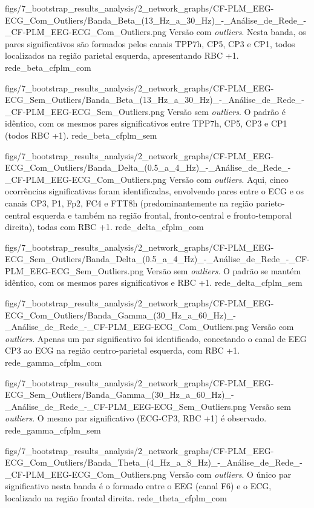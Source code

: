 \smallfigure
{figs/7_bootstrap_results_analysis/2_network_graphs/CF-PLM_EEG-ECG_Com_Outliers/Banda_Beta_(13_Hz_a_30_Hz)_-_Análise_de_Rede_-_CF-PLM_EEG-ECG_Com_Outliers.png}
{Versão com \textit{outliers}. Nesta banda, os pares significativos são formados pelos canais TPP7h, CP5, CP3 e CP1, todos localizados na região parietal esquerda, apresentando RBC +1.}
{rede_beta_cfplm_com}

\smallfigure
{figs/7_bootstrap_results_analysis/2_network_graphs/CF-PLM_EEG-ECG_Sem_Outliers/Banda_Beta_(13_Hz_a_30_Hz)_-_Análise_de_Rede_-_CF-PLM_EEG-ECG_Sem_Outliers.png}
{Versão sem \textit{outliers}. O padrão é idêntico, com os mesmos pares significativos entre TPP7h, CP5, CP3 e CP1 (todos RBC +1).}
{rede_beta_cfplm_sem}

\smallfigure
{figs/7_bootstrap_results_analysis/2_network_graphs/CF-PLM_EEG-ECG_Com_Outliers/Banda_Delta_(0.5_a_4_Hz)_-_Análise_de_Rede_-_CF-PLM_EEG-ECG_Com_Outliers.png}
{Versão com \textit{outliers}. Aqui, cinco ocorrências significativas foram identificadas, envolvendo pares entre o ECG e os canais CP3, P1, Fp2, FC4 e FTT8h (predominantemente na região parieto-central esquerda e também na região frontal, fronto-central e fronto-temporal direita), todas com RBC +1.}
{rede_delta_cfplm_com}

\smallfigure
{figs/7_bootstrap_results_analysis/2_network_graphs/CF-PLM_EEG-ECG_Sem_Outliers/Banda_Delta_(0.5_a_4_Hz)_-_Análise_de_Rede_-_CF-PLM_EEG-ECG_Sem_Outliers.png}
{Versão sem \textit{outliers}. O padrão se mantém idêntico, com os mesmos pares significativos e RBC +1.}
{rede_delta_cfplm_sem}

\smallfigure
{figs/7_bootstrap_results_analysis/2_network_graphs/CF-PLM_EEG-ECG_Com_Outliers/Banda_Gamma_(30_Hz_a_60_Hz)_-_Análise_de_Rede_-_CF-PLM_EEG-ECG_Com_Outliers.png}
{Versão com \textit{outliers}. Apenas um par significativo foi identificado, conectando o canal de EEG CP3 ao ECG na região centro-parietal esquerda, com RBC +1.}
{rede_gamma_cfplm_com}

\smallfigure
{figs/7_bootstrap_results_analysis/2_network_graphs/CF-PLM_EEG-ECG_Sem_Outliers/Banda_Gamma_(30_Hz_a_60_Hz)_-_Análise_de_Rede_-_CF-PLM_EEG-ECG_Sem_Outliers.png}
{Versão sem \textit{outliers}. O mesmo par significativo (ECG-CP3, RBC +1) é observado.}
{rede_gamma_cfplm_sem}

\smallfigure
{figs/7_bootstrap_results_analysis/2_network_graphs/CF-PLM_EEG-ECG_Com_Outliers/Banda_Theta_(4_Hz_a_8_Hz)_-_Análise_de_Rede_-_CF-PLM_EEG-ECG_Com_Outliers.png}
{Versão com \textit{outliers}. O único par significativo nesta banda é o formado entre o EEG (canal F6) e o ECG, localizado na região frontal direita.}
{rede_theta_cfplm_com}

